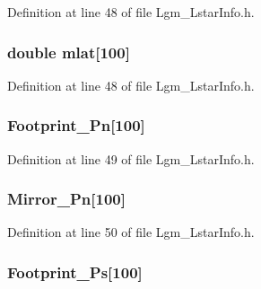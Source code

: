 Definition at line 48 of file Lgm\_\-LstarInfo.h.\hypertarget{struct_lgm___lstar_info_34853551c7862f1bca3adc0be7482483}{
\subsubsection[{mlat}]{\setlength{\rightskip}{0pt plus 5cm}double {\bf mlat}\mbox{[}100\mbox{]}}}
\label{struct_lgm___lstar_info_34853551c7862f1bca3adc0be7482483}




Definition at line 48 of file Lgm\_\-LstarInfo.h.\hypertarget{struct_lgm___lstar_info_9548ca1b43dee446afddb58200852ac4}{
\subsubsection[{Footprint\_\-Pn}]{ {\bf Footprint\_\-Pn}\mbox{[}100\mbox{]}}}
\label{struct_lgm___lstar_info_9548ca1b43dee446afddb58200852ac4}




Definition at line 49 of file Lgm\_\-LstarInfo.h.\hypertarget{struct_lgm___lstar_info_cab1b2b38cdcb108925a62d5776ea71c}{
\subsubsection[{Mirror\_\-Pn}]{ {\bf Mirror\_\-Pn}\mbox{[}100\mbox{]}}}
\label{struct_lgm___lstar_info_cab1b2b38cdcb108925a62d5776ea71c}




Definition at line 50 of file Lgm\_\-LstarInfo.h.\hypertarget{struct_lgm___lstar_info_ade743fcc24633af3a5485dc7a9d5147}{
\subsubsection[{Footprint\_\-Ps}]{ {\bf Footprint\_\-Ps}\mbox{[}100\mbox{]}}}
\label{struct_lgm___lstar_info_ade743fcc24633af3a5485dc7a9d5147}




